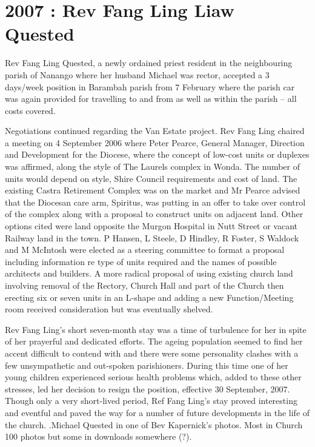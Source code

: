 \hypertarget{rev-fang-ling-liaw-quested}{%
\section{2007 : Rev Fang Ling Liaw Quested}\label{rev-fang-ling-liaw-quested}}

Rev Fang Ling Quested, a newly ordained priest resident in the neighbouring parish of Nanango where her husband Michael was rector, accepted a 3 days/week position in Barambah parish from 7 February where the parish car was again provided for travelling to and from as well as within the parish -- all costs covered.

Negotiations continued regarding the Van Estate project. Rev Fang Ling chaired a meeting on 4 September 2006 where Peter Pearce, General Manager, Direction and Development for the Diocese, where the concept of low-cost units or duplexes was affirmed, along the style of The Laurels complex in Wonda. The number of units would depend on style, Shire Council requirements and cost of land. The existing Castra Retirement Complex was on the market and Mr Pearce advised that the Diocesan care arm, Spiritus, was putting in an offer to take over control of the complex along with a proposal to construct units on adjacent land. Other options cited were land opposite the Murgon Hospital in Nutt Street or vacant Railway land in the town. P Hansen, L Steele, D Hindley, R Foster, S Waldock and M McIntosh were elected as a steering committee to format a proposal including information re type of units required and the names of possible architects and builders. A more radical proposal of using existing church land involving removal of the Rectory, Church Hall and part of the Church then erecting six or seven units in an L-shape and adding a new Function/Meeting room received consideration but was eventually shelved.

Rev Fang Ling's short seven-month stay was a time of turbulence for her in spite of her prayerful and dedicated efforts. The ageing population seemed to find her accent difficult to contend with and there were some personality clashes with a few unsympathetic and out-spoken parishioners. During this time one of her young children experienced serious health problems which, added to these other stresses, led her decision to resign the position, effective 30 September, 2007. Though only a very short-lived period, Ref Fang Ling's stay proved interesting and eventful and paved the way for a number of future developments in the life of the church. .Michael Quested in one of Bev Kapernick's photos. Most in Church 100 photos but some in downloads somewhere (?).

